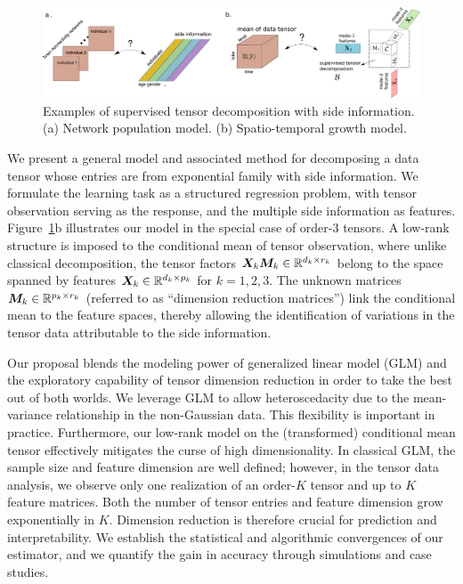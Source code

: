 \documentclass[12pt]{article}
\theoremstyle{definition}
\theoremstyle{definition}
\begin{document}
\begin{figure}[t]
\begin{center}
\includegraphics[width=16cm]{demo.pdf}
\end{center}
\caption{Examples of supervised tensor decomposition with side information. (a) Network population model. (b) Spatio-temporal growth model.} \label{fig:intro1}
\vspace{-.2cm}
\end{figure}

We present a general model and associated method for decomposing a data tensor whose entries are from exponential family with side information. We formulate the learning task as a structured regression problem, with tensor observation serving as the response, and the multiple side information as features. Figure~\ref{fig:intro1}b illustrates our model in the special case of order-3 tensors. A low-rank structure is imposed to the conditional mean of tensor observation, where unlike classical decomposition, the tensor factors $\bm X_k\bm M_k\in\mathbb{R}^{d_k\times r_k}$ belong to the space spanned by features $\bm X_k\in\mathbb{R}^{d_k\times p_k}$ for $k=1,2,3$. The unknown matrices $\bm M_k\in\mathbb{R}^{p_k\times r_k}$ (referred to as ``dimension reduction matrices'') link the conditional mean to the feature spaces, thereby allowing the identification of variations in the tensor data attributable to the side information.


Our proposal blends the modeling power of generalized linear model (GLM) and the exploratory capability of tensor dimension reduction in order to take the best out of both worlds. We leverage GLM to allow heteroscedacity due to the mean-variance relationship in the non-Gaussian data. This flexibility is important in practice. Furthermore, our low-rank model on the (transformed) conditional mean tensor effectively mitigates the curse of high dimensionality. In classical GLM, the sample size and feature dimension are well defined; however, in the tensor data analysis, we observe only one realization of an order-$K$ tensor and up to $K$ feature matrices. Both the number of tensor entries and feature dimension grow exponentially in $K$. Dimension reduction is therefore crucial for prediction and interpretability. We establish the statistical and algorithmic convergences of our estimator, and we quantify the gain in accuracy through simulations and case studies. 
 
\end{document}
